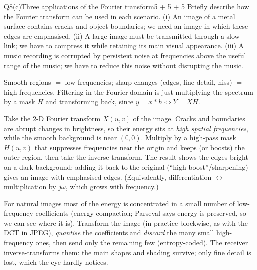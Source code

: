 \begin{qcard}{Q8(c)}{Three applications of the Fourier transform}{5 + 5 + 5}
Briefly describe how the Fourier transform can be used in each scenario. (i) An image of a metal surface contains cracks and object boundaries; we need an image in which these edges are emphasised. (ii) A large image must be transmitted through a slow link; we have to compress it while retaining its main visual appearance. (iii) A music recording is corrupted by persistent noise at frequencies above the useful range of the music; we have to reduce this noise without disrupting the music.
\end{qcard}
\begin{solution}
\begin{keyidea}Smooth regions $=$ low frequencies; sharp changes (edges, fine detail, hiss) $=$ high frequencies. Filtering in the Fourier domain is just multiplying the spectrum by a mask $H$ and transforming back, since $y=x*h\iff Y=XH$.\end{keyidea}

 Take the 2-D Fourier transform $X(u,v)$ of the image. Cracks and boundaries are abrupt changes in brightness, so their energy sits at \emph{high spatial frequencies}, while the smooth background is near $(0,0)$. Multiply by a high-pass mask $H(u,v)$ that suppresses frequencies near the origin and keeps (or boosts) the outer region, then take the inverse transform. The result shows the edges bright on a dark background; adding it back to the original (``high-boost''/sharpening) gives an image with emphasised edges. (Equivalently, differentiation $\leftrightarrow$ multiplication by $j\omega$, which grows with frequency.)

 For natural images most of the energy is concentrated in a small number of low-frequency coefficients (energy compaction; Parseval says energy is preserved, so we can see where it is). Transform the image (in practice blockwise, as with the DCT in JPEG), \emph{quantise} the coefficients and \emph{discard} the many small high-frequency ones, then send only the remaining few (entropy-coded). The receiver inverse-transforms them: the main shapes and shading survive; only fine detail is lost, which the eye hardly notices.


\end{solution}
